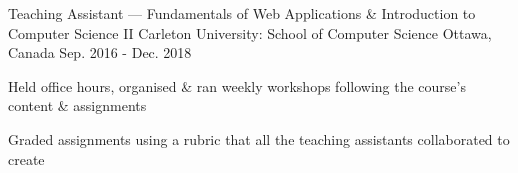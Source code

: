 \begin{cventries}
	\cventry
		{Teaching Assistant --- Fundamentals of Web Applications \& Introduction to Computer Science II}
		{Carleton University: School of Computer Science}
		{Ottawa, Canada}
		{Sep. 2016 - Dec. 2018}
		{\begin{cvitems}
			\item Held office hours, organised \& ran weekly workshops following the course's content \& assignments
			\item Graded assignments using a rubric that all the teaching assistants collaborated to create
		\end{cvitems}}
\end{cventries}
